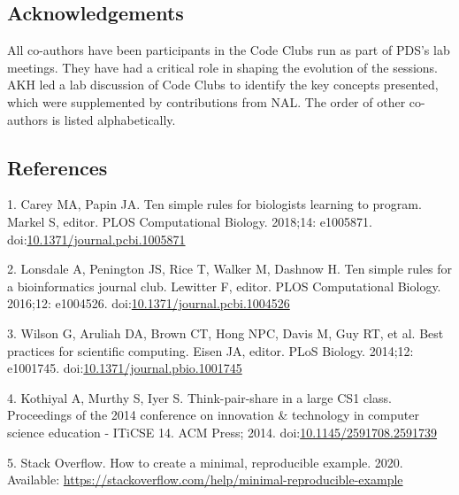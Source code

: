 \documentclass[
  11pt,
]{article}
\begin{document}
\hypertarget{acknowledgements}{%
\subsection{Acknowledgements}\label{acknowledgements}}

All co-authors have been participants in the Code Clubs run as part of
PDS's lab meetings. They have had a critical role in shaping the
evolution of the sessions. AKH led a lab discussion of Code Clubs to
identify the key concepts presented, which were supplemented by
contributions from NAL. The order of other co-authors is listed
alphabetically.

\newpage

\hypertarget{references}{%
\subsection{References}\label{references}}

\hypertarget{refs}{}
\leavevmode\hypertarget{ref-Carey2018}{}%
1. Carey MA, Papin JA. Ten simple rules for biologists learning to
program. Markel S, editor. PLOS Computational Biology. 2018;14:
e1005871.
doi:\href{https://doi.org/10.1371/journal.pcbi.1005871}{10.1371/journal.pcbi.1005871}

\leavevmode\hypertarget{ref-Lonsdale2016}{}%
2. Lonsdale A, Penington JS, Rice T, Walker M, Dashnow H. Ten simple
rules for a bioinformatics journal club. Lewitter F, editor. PLOS
Computational Biology. 2016;12: e1004526.
doi:\href{https://doi.org/10.1371/journal.pcbi.1004526}{10.1371/journal.pcbi.1004526}

\leavevmode\hypertarget{ref-Wilson2014}{}%
3. Wilson G, Aruliah DA, Brown CT, Hong NPC, Davis M, Guy RT, et al.
Best practices for scientific computing. Eisen JA, editor. PLoS Biology.
2014;12: e1001745.
doi:\href{https://doi.org/10.1371/journal.pbio.1001745}{10.1371/journal.pbio.1001745}

\leavevmode\hypertarget{ref-Kothiyal2014}{}%
4. Kothiyal A, Murthy S, Iyer S. Think-pair-share in a large CS1 class.
Proceedings of the 2014 conference on innovation \& technology in
computer science education - ITiCSE 14. ACM Press; 2014.
doi:\href{https://doi.org/10.1145/2591708.2591739}{10.1145/2591708.2591739}

\leavevmode\hypertarget{ref-StackOverflow_MREE}{}%
5. Stack Overflow. How to create a minimal, reproducible example. 2020.
Available:
\url{https://stackoverflow.com/help/minimal-reproducible-example}
\end{document}

